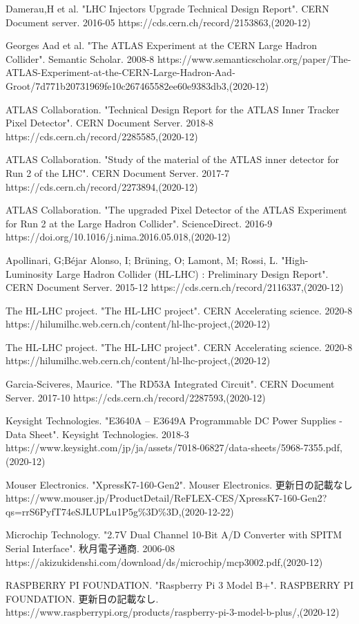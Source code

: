 \begin{thebibliography}{9}

Damerau,H et al. "LHC Injectors Upgrade Technical Design Report". CERN Document server. 2016-05
https://cds.cern.ch/record/2153863,(2020-12)

Georges Aad et al. "The ATLAS Experiment at the CERN Large Hadron Collider". Semantic Scholar. 2008-8
https://www.semanticscholar.org/paper/The-ATLAS-Experiment-at-the-CERN-Large-Hadron-Aad-Groot/7d771b20731969fe10c267465582ee60e9383db3,(2020-12)

ATLAS Collaboration. "Technical Design Report for the ATLAS Inner Tracker Pixel Detector". CERN Document Server. 2018-8
https://cds.cern.ch/record/2285585,(2020-12)

ATLAS Collaboration. "Study of the material of the ATLAS inner detector for Run 2 of the LHC". CERN Document Server. 2017-7
https://cds.cern.ch/record/2273894,(2020-12)

ATLAS Collaboration. "The upgraded Pixel Detector of the ATLAS Experiment for Run 2 at the Large Hadron Collider". ScienceDirect. 2016-9
https://doi.org/10.1016/j.nima.2016.05.018,(2020-12)

Apollinari, G;Béjar Alonso, I; Brüning, O; Lamont, M; Rossi, L. "High-Luminosity Large Hadron Collider (HL-LHC) : Preliminary Design Report". CERN Document Server. 2015-12
https://cds.cern.ch/record/2116337,(2020-12)

The HL-LHC project. "The HL-LHC project". CERN Accelerating science. 2020-8
https://hilumilhc.web.cern.ch/content/hl-lhc-project,(2020-12)



The HL-LHC project. "The HL-LHC project". CERN Accelerating science. 2020-8
https://hilumilhc.web.cern.ch/content/hl-lhc-project,(2020-12)

Garcia-Sciveres, Maurice. "The RD53A Integrated Circuit". CERN Document Server. 2017-10
https://cds.cern.ch/record/2287593,(2020-12)

Keysight Technologies. "E3640A – E3649A Programmable DC Power Supplies - Data Sheet". Keysight Technologies. 2018-3
https://www.keysight.com/jp/ja/assets/7018-06827/data-sheets/5968-7355.pdf,(2020-12)

Mouser Electronics. "XpressK7-160-Gen2". Mouser Electronics. 更新日の記載なし
https://www.mouser.jp/ProductDetail/ReFLEX-CES/XpressK7-160-Gen2?qs=rrS6PyfT74eSJLUPLu1P5g\%3D\%3D,(2020-12-22)

Microchip Technology. "2.7V Dual Channel 10-Bit A/D Converter with SPITM Serial Interface". 秋月電子通商. 2006-08
https://akizukidenshi.com/download/ds/microchip/mcp3002.pdf,(2020-12)

RASPBERRY PI FOUNDATION. "Raspberry Pi 3 Model B+". RASPBERRY PI FOUNDATION. 更新日の記載なし.
https://www.raspberrypi.org/products/raspberry-pi-3-model-b-plus/,(2020-12)

\end{thebibliography}
